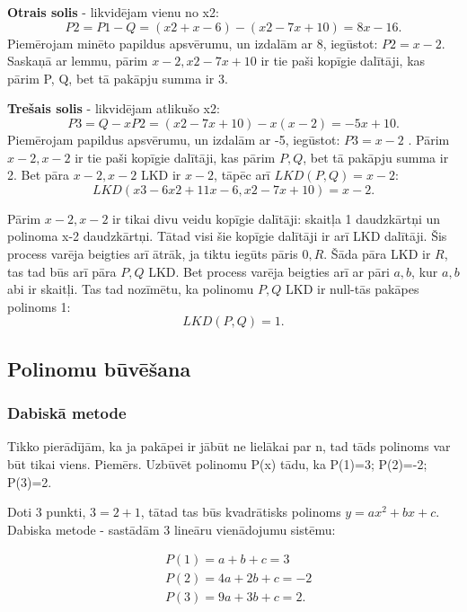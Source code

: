 \documentclass{article}
\begin{document}
\textbf{Otrais solis} - likvidējam vienu no x2:
\begin{equation}
	P2=P1 - Q =(x2+x-6)-(x2-7x+10)=8x-16.
\end{equation}
Piemērojam minēto papildus apsvērumu, un izdalām ar 8, iegūstot: $P2=x - 2$.  Saskaņā ar lemmu, pārim ${x-2, x2-7x+10}$ ir tie paši kopīgie dalītāji, kas pārim {P, Q}, bet tā pakāpju summa ir 3.

\textbf{Trešais solis} - likvidējam atlikušo x2:
\begin{equation}
	P3=Q-xP2=( x2 - 7 x +10)- x( x - 2)=-5 x+10 .
\end{equation}
Piemērojam papildus apsvērumu, un izdalām ar -5, iegūstot: $P3=x - 2$ .
Pārim ${x-2, x-2}$ ir tie paši kopīgie dalītāji, kas pārim ${P, Q}$,
bet tā pakāpju summa ir 2.  Bet pāra ${x-2, x-2}$ LKD ir $x-2$, tāpēc arī $LKD(P, Q)=x-2$:
\begin{equation}
	LKD(x3-6x2+11x-6, x2-7x+10)=x-2.
\end{equation}

Pārim ${x-2, x-2}$ ir tikai divu veidu kopīgie dalītāji: skaitļa 1 daudzkārtņi un polinoma x-2 daudzkārtņi. Tātad visi šie kopīgie dalītāji ir arī LKD dalītāji.  Šis process varēja beigties arī ātrāk, ja tiktu iegūts pāris ${0, R}$.  Šāda pāra LKD ir $R$, tas tad būs arī pāra ${P, Q}$ LKD.  Bet process varēja beigties arī ar pāri ${a, b}$, kur $a, b$ abi ir skaitļi.  Tas tad nozīmētu, ka polinomu ${P, Q}$ LKD ir null-tās pakāpes polinoms 1:
\begin{equation}
	LKD(P, Q)=1.
\end{equation}


\subsection{Polinomu būvēšana}

\subsubsection{Dabiskā metode}

Tikko pierādījām, ka ja pakāpei ir jābūt ne lielākai par n, tad tāds polinoms var būt tikai viens. Piemērs. Uzbūvēt polinomu P(x) tādu, ka P(1)=3; P(2)=-2; P(3)=2.

Doti 3 punkti, $3=2+1$, tātad tas būs kvadrātisks polinoms $y=ax^2+bx+c$.
Dabiska metode - sastādām 3 lineāru vienādojumu sistēmu:

\begin{align}
	&P(1)=a+b+c=3 \\
	&P(2)=4 a+2 b+c=-2 \\
	&P(3)=9 a+3 b+c=2.
\end{align}
\end{document}
